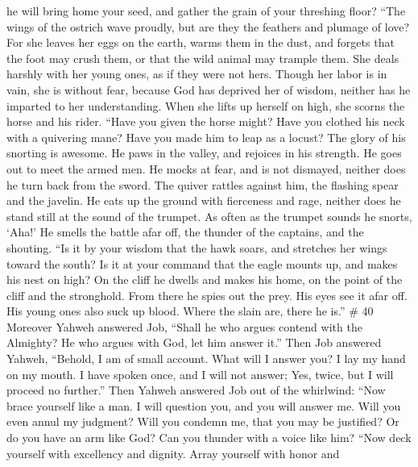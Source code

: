 he will bring home your seed, and gather the grain of your threshing
floor?  ``The wings of the ostrich wave proudly, but are
they the feathers and plumage of love?  For she leaves her
eggs on the earth, warms them in the dust,  and forgets
that the foot may crush them, or that the wild animal may trample them.
 She deals harshly with her young ones, as if they were not
hers. Though her labor is in vain, she is without fear, 
because God has deprived her of wisdom, neither has he imparted to her
understanding.  When she lifts up herself on high, she
scorns the horse and his rider.  ``Have you given the horse
might? Have you clothed his neck with a quivering mane? 
Have you made him to leap as a locust? The glory of his snorting is
awesome.  He paws in the valley, and rejoices in his
strength. He goes out to meet the armed men.  He mocks at
fear, and is not dismayed, neither does he turn back from the sword.
 The quiver rattles against him, the flashing spear and the
javelin.  He eats up the ground with fierceness and rage,
neither does he stand still at the sound of the trumpet. 
As often as the trumpet sounds he snorts, `Aha!' He smells the battle
afar off, the thunder of the captains, and the shouting. 
``Is it by your wisdom that the hawk soars, and stretches her wings
toward the south?  Is it at your command that the eagle
mounts up, and makes his nest on high?  On the cliff he
dwells and makes his home, on the point of the cliff and the stronghold.
 From there he spies out the prey. His eyes see it afar
off.  His young ones also suck up blood. Where the slain
are, there he is.'' \# 40  Moreover Yahweh answered Job,
 ``Shall he who argues contend with the Almighty? He who
argues with God, let him answer it.''  Then Job answered
Yahweh,  ``Behold, I am of small account. What will I answer
you? I lay my hand on my mouth.  I have spoken once, and I
will not answer; Yes, twice, but I will proceed no further.''
 Then Yahweh answered Job out of the whirlwind: 
``Now brace yourself like a man. I will question you, and you will
answer me.  Will you even annul my judgment? Will you
condemn me, that you may be justified?  Or do you have an
arm like God? Can you thunder with a voice like him?  ``Now
deck yourself with excellency and dignity. Array yourself with honor and
